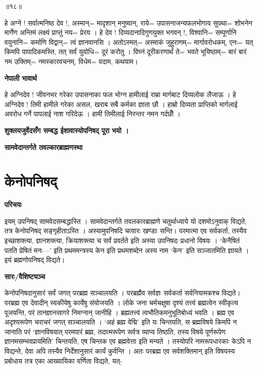 \documentclass[11pt, a5paper]{article}
\begin{document}
॥१८॥

हे अग्ने ! सर्वात्मनिष्ठ देव !, अस्मान्= मादृशान् मनुष्यान्, राये= उपासनाजन्यफलभोगाय सुपथा= शोभनेन मार्गेण अन्तिमं लक्ष्यं प्राप्तुं नय= प्रेरय । हे देव ! दिव्यदानादिगुणयुक्त भगवन् !,  विश्वानि= सम्पूर्णानि वयुनानि= कर्माणि विद्वान्= त्वं ज्ञानवानसि ।  अतोऽस्मत्= अस्माकं जुहुराणम्= मार्गावरोधकम्, एनः= यत् किमपि पापादिकमस्ति, तत् सर्वं युयोधि= दूरं करोतु । विघ्नं दूरीकरणार्थं ते= भवते भूयिष्ठाम्= बारं बारं नम उक्तिम्= नमस्कारवचनम्, विधेम‍= वदाम, कथयाम।

\textbf{नेपाली भावार्थ}

हे अग्निदेव ! जीवनभर गरेका उपासनाका फल भोग्न  हामीलाई राम्रा मार्गबाट दिव्यलोक लैजाऊ । हे अग्निदेव ! तिमी हामीले गरेका असल, खराब सबै कर्मका ज्ञाता छौ । हाम्रो दिव्यता प्राप्तिको मार्गलाई अवरोध गर्ने पापलाई नाश गरिदेऊ । हामी तिमीलाई निरन्तर नमन गर्दछौँ ।

\textbf{शुक्लयजुर्वेदसँग सम्बद्ध ईशावास्योपनिषद् पूरा भयो ।}

\textbf{सामवेदान्तर्गते तवल्कारब्राह्मणस्था}

\section{\textbf{केनोपनिषद्}}

\textbf{परिचयः}

इयम् उपनिषद् सामवेदसम्बद्धास्ति । सामवेदान्तर्गते तवलकारब्राह्मणे चतुर्थाध्याये यो दशमोऽनुवाक् विद्यते, तत्र केनोपनिषद् सङ्‌गृहीताऽस्ति । अस्यामुपनिषदि चत्वारः खण्डाः सन्ति। परमात्मा एव सर्वकर्ता, तस्यैव इच्छाशक्त्या, ज्ञानशक्त्या, क्रियाशक्त्या च सर्वं प्रवर्तते इति अस्या उपनिषदः प्रधानो विषयः । ‘केनैषितं पतति प्रेषितं मनः—’ इति प्रथममन्त्रस्य केन इति प्रथमशब्देन अस्य नाम ‘केन’ इति सञ्जातमिति ज्ञायते । इयं ब्रह्मणोपनिषद् विद्यते।

\textbf{सारः/वैशिष्ट्यञ्च}

केनोपनिषदानुसारं सर्वं जगत् परब्रह्म सञ्चालयति । परब्रह्मैव सर्वज्ञः सर्वकर्ता सर्वनियामकश्च विद्यते। परब्रह्म एव देवादीन् स्वकीयेषु कार्येषु संयोजयति । लोके जना चर्मचक्षुषा दृश्यं तत्त्वं ब्रह्मत्वेन स्वीकृत्य पूजयन्ति, परं तानज्ञानसागरे निमग्नान् जानीहि । ब्रह्मतत्त्वं त्वभौतिकमनुभूतिबोध्यं भवति । ब्रह्म एव अदृश्यरूपेण चराचरं जगत् सञ्चालयति । ‘अहं ब्रह्म वेद्मि’ इति यः चिन्तयति, स ब्रह्मविषये किमपि न जानाति परं ‘ज्ञानविषयात् परमपारं ब्रह्म, तदात्मरूपेण सर्वत्र व्याप्य तिष्ठति, तस्य विषये पूर्णरूपेण ज्ञानमसम्भवप्रायमिति’ चिन्तयति, एष चिन्तक एव ब्रह्मवेत्ता इति मन्यते । तस्योपरि नामरूपधारकाः केऽपि न विद्यन्ते, देवा अपि तस्यैव निर्देशानुसारं कार्यं कुर्वन्ति । अतः  परब्रह्म एव सर्वशक्तिमान् इति विषयस्य प्रबोधाय तत्र एका आख्यायिका वर्णिता विद्यते, यत्-
\end{document}

